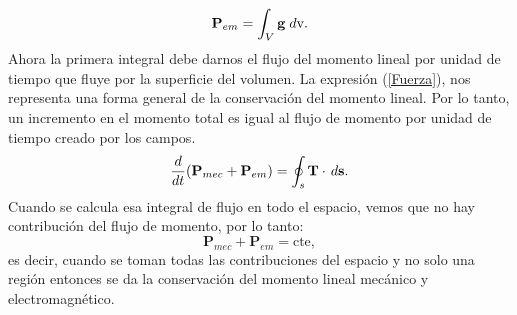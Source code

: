 \documentclass[11pt,fleqn]{book} %
\begin{document}
\begin{equation}
 \textbf{P}_{em}=\int_{V} \textbf{g}\hspace{1mm} d\text{v}.
 \end{equation}
Ahora la primera integral debe darnos el flujo del momento lineal por unidad de tiempo que fluye por la superficie del volumen. La expresi\'on (\ref{Fuerza}), nos representa una forma general de la conservaci\'on del momento lineal.
Por lo tanto, un incremento en el momento total es igual al flujo de momento por unidad de tiempo creado por los campos.
\begin{equation}
\frac{d}{dt}(\textbf{P}_{mec}+\textbf{P}_{em})=\oint_{s}\textbf{T}\cdot\hspace{0.5mm} d\textbf{s}.
\end{equation}
Cuando se calcula esa integral de flujo en todo el espacio, vemos que no hay contribuci\'on del flujo de momento, por lo tanto:
\begin{equation}
\textbf{P}_{mec}+\textbf{P}_{em}=\text{cte},
\end{equation}
es decir, cuando se toman todas las contribuciones del espacio y no solo una regi\'on entonces se da la conservaci\'on del momento lineal mec\'anico y electromagn\'etico.\\\\
\end{document}

